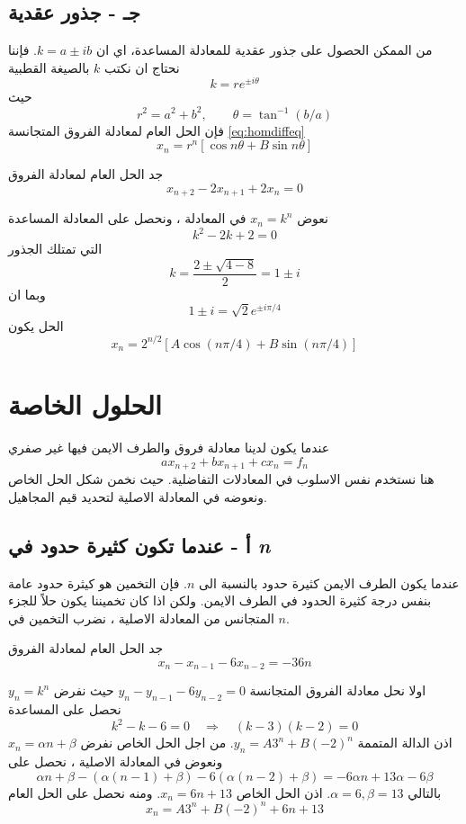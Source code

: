 \subsection*{جـ - جذور عقدية}
من الممكن الحصول على جذور عقدية للمعادلة المساعدة، اي ان $k = a\pm ib$. فإننا نحتاج ان نكتب $k$ بالصيغة القطبية
\[
k = r e^{\pm i\theta}
\]
حيث
\[
r^2 = a^2 + b^2, \qquad \theta = \tan^{-1}(b/a)
\]
فإن الحل العام لمعادلة الفروق المتجانسة \eqref{eq:homdiffeq} 
\[
x_n = r^n [\cos n\theta + B \sin n\theta]
\]

\begin{example}
	جد الحل العام لمعادلة الفروق 
	\[
	x_{n+2} - 2x_{n+1} + 2x_n = 0
	\]
\end{example}
\begin{solution}
	نعوض $x_n = k^n$ في المعادلة ، ونحصل على المعادلة المساعدة
	\[
	k^2 - 2k + 2 =0
	\]
	التي تمتلك الجذور
	\[
	k = \frac{2\pm\sqrt{4-8}}{2} = 1 \pm i
	\]
	وبما ان 
	\[
	1 \pm i = \sqrt{2} e ^{\pm i \pi/4}
	\]
	الحل يكون
	\[
	x_n = 2^{n/2} [A\cos(n \pi/4) + B \sin(n \pi/4)]
	\]
\end{solution}

\section{الحلول الخاصة}
عندما يكون لدينا معادلة فروق والطرف الايمن فيها غير صفري
\[
a x_{n+2} + bx_{n+1} +cx_n = f_n
\]
هنا نستخدم نفس الاسلوب في المعادلات التفاضلية. حيث نخمن شكل الحل الخاص ونعوضه في المعادلة الاصلية لتحديد قيم المجاهيل.

\subsection*{أ - عندما تكون  كثيرة حدود في \textit{n}}
عندما يكون الطرف الايمن كثيرة حدود بالنسبة الى $n$. فإن التخمين هو كيثرة حدود عامة بنفس درجة كثيرة الحدود في الطرف الايمن. ولكن اذا كان تخميننا يكون حلاً للجزء المتجانس من المعادلة الاصلية ، نضرب التخمين في $n$.

\begin{example}
 جد الحل العام لمعادلة الفروق
 \[
 x_n - x_{n-1} - 6x_{n-2} = -36n
 \]
\end{example}
\begin{solution}
	اولا نحل معادلة الفروق المتجانسة $ y_n - y_{n-1} - 6y_{n-2} = 0 $ حيث نفرض $y_n = k^n$ نحصل على المساعدة
	\[
	k^2 - k - 6=0 \quad \Rightarrow \quad (k-3)(k-2) =0
	\]
	اذن الدالة المتممة $y_n = A3^n + B (-2)^n$. من اجل الحل الخاص نفرض $x_n = \alpha n+\beta$ ونعوض في المعادلة الاصلية ، نحصل على
	\[
	\alpha n+\beta - (\alpha(n-1) + \beta) - 6(\alpha(n-2) + \beta) = -6\alpha n + 13\alpha - 6 \beta
	\]
	بالتالي $\alpha = 6, \beta=13$. اذن الحل الخاص $x_n = 6n + 13 $. ومنه نحصل على الحل العام
	\[
	x_n = A3^n + B (-2)^n + 6n + 13
	\]
\end{solution}


